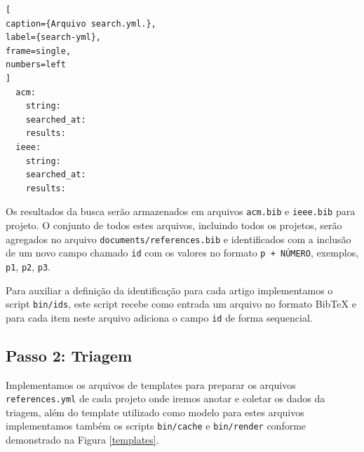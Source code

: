\begin{lstlisting}[
caption={Arquivo search.yml.},
label={search-yml},
frame=single,
numbers=left
]
  acm:
    string:
    searched_at:
    results:
  ieee:
    string:
    searched_at:
    results:
\end{lstlisting}


Os resultados da busca serão armazenados em arquivos \texttt{acm.bib} e
\texttt{ieee.bib} para projeto. O conjunto de todos estes arquivos, incluindo
todos os projetos, serão agregados no arquivo \texttt{documents/references.bib}
e identificados com a inclusão de um novo campo chamado \texttt{id} com os
valores no formato \texttt{p + NÚMERO}, exemplos, \texttt{p1}, \texttt{p2},
\texttt{p3}.

Para auxiliar a definição da identificação para cada artigo implementamos o
script \texttt{bin/ids}, este script recebe como entrada um arquivo no formato
BibTeX e para cada item neste arquivo adiciona o campo \texttt{id} de forma
sequencial.





\subsection{Passo 2: Triagem}

Implementamos os arquivos de templates para preparar os arquivos
\texttt{references.yml} de cada projeto onde iremos anotar e coletar os dados
da triagem, além do template utilizado como modelo para estes arquivos
implementamos também os scripts \texttt{bin/cache} e \texttt{bin/render} conforme
demonstrado na Figura \ref{templates}.


